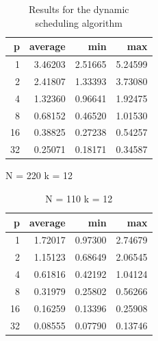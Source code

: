 \documentclass[letterpaper,twoside,11pt]{article}
\begin{document}
\begin{multicols}{2}
\begin{table}[H]
    \begin{subtable}{.5\textwidth}
      \centering
        \begin{tabular}{*{4}{r}}
        \textbf{p} &   \textbf{average} &       \textbf{min} &       \textbf{max} \\
            \midrule
            1 & 3.46203 & 2.51665 & 5.24599\\
            2 & 2.41807 & 1.33393 & 3.73080\\
            4 & 1.32360 & 0.96641 & 1.92475\\
            8 & 0.68152 & 0.46520 & 1.01530\\
            16 & 0.38825 & 0.27238 & 0.54257\\
            32 & 0.25071 & 0.18171 & 0.34587\\
        \end{tabular}
        \caption{N = 220 k = 12}
        \label{tab:Results_naive220}
    \end{subtable}%
    \caption{Results for the dynamic scheduling algorithm}
    \label{tab:Results_naive}
\end{table}
\begin{table}[H]
	\centering
    \begin{subtable}{.5\textwidth}
      \centering
        \begin{tabular}{*{4}{r}}
        \textbf{p} &   \textbf{average} &       \textbf{min} &       \textbf{max} \\
            \midrule
            1 & 1.72017 & 0.97300 & 2.74679\\
            2 & 1.15123 & 0.68649 & 2.06545\\
            4 & 0.61816 & 0.42192 & 1.04124\\
            8 & 0.31979 & 0.25802 & 0.56266\\
            16 & 0.16259 & 0.13396 & 0.25908\\
            32 & 0.08555 & 0.07790 & 0.13746\\
        \end{tabular}
        \caption{N = 110 k = 12}
        \label{tab:Results_final110}
    \end{subtable}%


\end{table}
\end{multicols}
\end{document}
